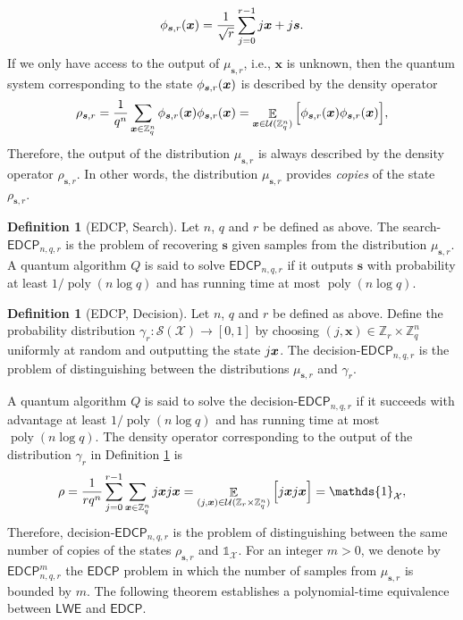 \documentclass[11pt]{article}
\theoremstyle{plain}
\theoremstyle{definition}
\newtheorem{definition}[theorem]{Definition}
\DeclareMathOperator{\poly}{poly}
\DeclareMathOperator{\E}{\mathbb{E}}
\let\ket\relax
\DeclarePairedDelimiter{\ket}{\lvert}{\rangle}
\let\bra\relax
\DeclarePairedDelimiter{\bra}{\langle}{\rvert}
\def\Z{\mathbb{Z}}
\def\lwe{\mathsf{LWE}}
\def\edcp{\mathsf{EDCP}}
\def\X{\mathcal{X}}
\def\SX{\mathcal{S(X)}}
\def\U{\mathcal{U}}
\begin{document}
\[ \ket{\phi_{\bm{s}, r}(\bm{x})} = \frac{1}{\sqrt{r}} \sum_{j = 0}^{r - 1}\ket{j}\ket{\bm{x} + j\bm{s}}. \]
If we only have access to the output of $\mu_{\bm{s}, r}$, i.e., $\bm{x}$ is unknown, then the quantum system corresponding to the state $\ket{\phi_{\bm{s}, r}(\bm{x})}$ is described by the density operator
\[ \rho_{\bm{s}, r} = \frac{1}{q^n} \sum_{\bm{x} \in \Z_q^n} \ket{\phi_{\bm{s}, r}(\bm{x})} \bra{\phi_{\bm{s}, r}(\bm{x})} = \E_{\bm{x} \in \U(\Z_q^n)} \Big[ \ket{\phi_{\bm{s}, r}(\bm{x})} \bra{\phi_{\bm{s}, r}(\bm{x})} \Big], \]
Therefore, the output of the distribution $\mu_{\bm{s}, r}$ is always described by the density operator $\rho_{\bm{s}, r}$. In other words, the distribution $\mu_{\bm{s}, r}$ provides \textit{copies} of the state $\rho_{\bm{s}, r}$.
\begin{definition}[EDCP, Search]
    Let $n$, $q$ and $r$ be defined as above. The search-$\edcp_{n, q, r}$ is the problem of recovering $\bm{s}$ given samples from the distribution $\mu_{\bm{s}, r}$. A quantum algorithm $Q$ is said to solve $\edcp_{n, q, r}$ if it outputs $\bm{s}$ with probability at least $1 / \poly(n\log q)$ and has running time at most $\poly(n\log q)$.
\end{definition}
\begin{definition}[EDCP, Decision]
    \label{def:d-edcp}
    Let $n$, $q$ and $r$ be defined as above. Define the probability distribution $\gamma_r: \SX \rightarrow [0, 1]$ by choosing $(j, \bm{x}) \in \Z_r \times \Z_q^n$ uniformly at random and outputting the state $\ket{j}\ket{\bm{x}}$. The decision-$\edcp_{n, q, r}$ is the problem of distinguishing between the distributions $\mu_{\bm{s}, r}$ and $\gamma_r$.
\end{definition}
A quantum algorithm $Q$ is said to solve the decision-$\edcp_{n, q, r}$ if it succeeds with advantage at least $1 / \poly(n\log q)$ and has running time at most $\poly(n\log q)$. The density operator corresponding to the output of the distribution $\gamma_r$ in Definition \ref{def:d-edcp} is
\[ \rho = \frac{1}{rq^n} \sum_{j = 0}^{r - 1} \sum_{\bm{x} \in \Z_q^n}  \ket{j}\ket{\bm{x}} \bra{j}\bra{\bm{x}} = \E_{(j, \bm{x}) \in \U(\Z_r \times \Z_q^n)} \Big[ \ket{j}\ket{\bm{x}} \bra{j}\bra{\bm{x}} \Big] = \mathds{1}_{\X}, \]
Therefore, decision-$\edcp_{n, q, r}$ is the problem of distinguishing between the same number of copies of the states $\rho_{\bm{s}, r}$ and $\mathds{1}_{\X}$. For an integer $m > 0$, we denote by $\edcp_{n, q, r}^m$ the $\edcp$ problem in which the number of samples from $\mu_{\bm{s}, r}$ is bounded by $m$. The following theorem establishes a polynomial-time equivalence between $\lwe$ and $\edcp$.
\end{document}
